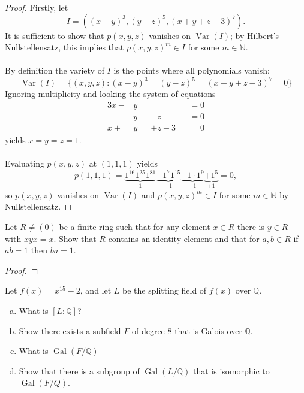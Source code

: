 \documentclass{article}
\newenvironment{problem}[2][Problem]{\begin{trivlist}
\item[\hskip \labelsep {\bfseries #1}\hskip \labelsep {\bfseries #2.}]}{\end{trivlist}}
\newcommand{\N}{\mathbb N}
\newcommand{\Q}{\mathbb Q}
\newcommand{\set}[1]{\{#1\}}
\newcommand{\Gal}{\operatorname{Gal}}
\newcommand{\Var}{\operatorname{Var}}
\begin{document}
\begin{proof}
  Firstly, let \[
    I = ((x - y)^3, (y - z)^5, (x + y + z - 3)^7).
  \] It is sufficient to show that $p(x,y,z)$ vanishes on $\Var(I)$; by
  Hilbert's Nullstellensatz,
  this implies that $p(x,y,z)^m \in I$ for some $m \in \N$.
  \\~\\
  By definition the variety of $I$ is the points where all polynomials vanish: \[
    \Var(I) = \set{(x,y,z) : (x - y)^3 = (y - z)^5 = (x + y + z - 3)^7 = 0}
  \]
  Ignoring multiplicity and looking the system of equations \begin{alignat*}{3}
    x - & y &&         && = 0 \\
        & y && - z     && = 0 \\
    x + & y && + z - 3 && = 0
  \end{alignat*} yields $x = y = z = 1$.
  \\~\\
  Evaluating $p(x,y,z)$ at $(1,1,1)$ yields \[
    p(1,1,1) =
      \underbrace{1^{16}1^{25}1^{81}}_1
      \underbrace{- 1^{7}1^{15}}_{-1}
      \underbrace{- 1\cdot1^{9}}_{-1}
      \underbrace{+ 1^5}_{+1} = 0,
  \] so $p(x,y,z)$ vanishes on $\Var(I)$ and
  $p(x,y,z)^m \in I$ for some $m \in \N$ by Nullstellensatz.
\end{proof}
\pagebreak

\begin{problem}{4}
  Let $R \neq (0)$ be a finite ring such that for any element $x \in R$ there is $y \in R$ with $xyx = x$. Show that $R$ contains an identity element and that for $a, b \in R$ if $ab = 1$ then $ba = 1$.
\end{problem}

\begin{proof}
\end{proof}
\pagebreak

\begin{problem}{5}
  Let $f(x) = x^{15} - 2$, and let $L$ be the splitting field of $f(x)$ over $\Q$. \begin{enumerate}[(a)]
    \item What is $[L:\Q]$?
    \item Show there exists a subfield $F$ of degree $8$ that is Galois over $\Q$.
    \item What is $\Gal(F/\Q)$
    \item Show that there is a subgroup of $\Gal(L/\Q)$ that is isomorphic to $\Gal(F/Q)$.
  \end{enumerate}
\end{problem}
\end{document}

